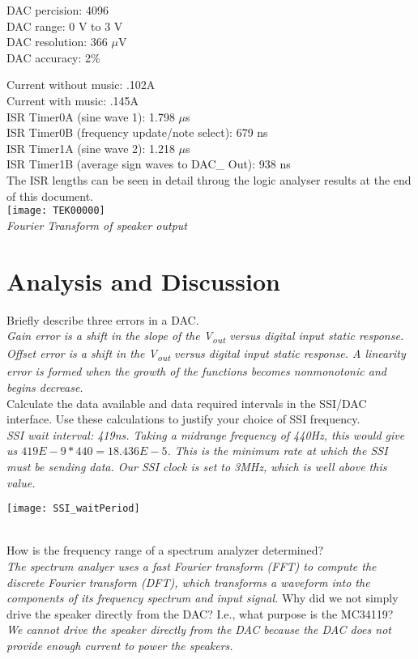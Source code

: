 \documentclass[twoside]{article}
\begin{document}
DAC percision: 4096 \\
DAC range: 0 V to 3 V\\
DAC resolution: 366 $\mu$V\\
DAC accuracy: 2\%

\noindent Current without music: .102A\\
Current with music: .145A\\

\noindent ISR Timer0A (sine wave 1): 1.798 $\mu$s\\
ISR Timer0B  (frequency update/note select): 679 ns\\
ISR Timer1A (sine wave 2): 1.218 $\mu$s\\
ISR Timer1B (average sign waves to DAC\_ Out): 938 ns \\
The ISR lengths can be seen in detail throug the logic analyser results at the end of this document.\\
\texttt{[image: TEK00000]}\\
\emph{Fourier Transform of speaker output}

\section*{Analysis and Discussion}


\begin{pset}
   Briefly describe three errors in a DAC. \\
  \emph{Gain error is a shift in the slope of the V\textsubscript{out} versus digital input static response. Offset error is a shift in the V\textsubscript{out} versus digital input static response. A linearity error is formed when the growth of the functions becomes nonmonotonic and begins decrease.\\}
   Calculate the data available and data required intervals in the SSI/DAC interface. Use these calculations to justify your choice of SSI frequency. \\ 
  \emph{SSI wait interval: 419ns. Taking a midrange frequency of 440Hz, this would give us $419E-9*440=18.436E-5$. This is the minimum rate at which the SSI must be sending data. Our SSI clock is set to 3MHz, which is well above this value.}\\
  \centerline{\texttt{[image: SSI\_waitPeriod]}}\\
  \vskip 0.1in
   How is the frequency range of a spectrum analyzer determined? \\ 
  \emph{The spectrum analyer uses a fast Fourier transform (FFT) to compute the discrete Fourier transform (DFT), which transforms a waveform into the components of its frequency spectrum and input signal.}
   Why did we not simply drive the speaker directly from the DAC? I.e., what purpose is the MC34119? \\
  \emph{We cannot drive the speaker directly from the DAC because the DAC does not provide enough current to power the speakers.}

\end{pset}
\end{document}
